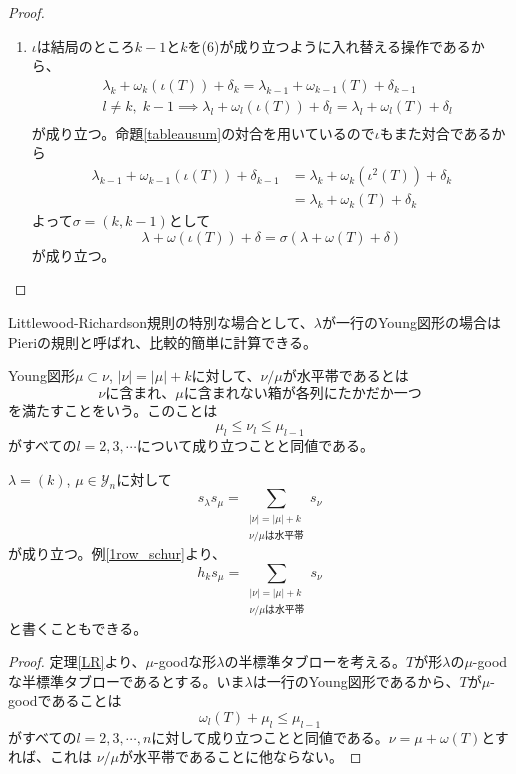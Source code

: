 \documentclass{ltjsreport}
\begin{document}
\begin{proof}
\begin{enumerate}
        \item $\iota$は結局のところ$k-1$と$k$を(6)が成り立つように入れ替える操作であるから、
        \begin{align*}
            &\lambda_{k}+\omega_k(\iota(T))+\delta_k=\lambda_{k-1}+\omega_{k-1}(T)+\delta_{k-1}\\
            & l\neq k,\;k-1\implies \lambda_{l}+\omega_l(\iota(T))+\delta_l=\lambda_{l}+\omega_{l}(T)+\delta_{l}\\
        \end{align*}
        が成り立つ。命題\ref{tableausum}の対合を用いているので$\iota$もまた対合であるから
        \begin{align*}
            \lambda_{k-1}+\omega_{k-1}(\iota(T))+\delta_{k-1}
            &=\lambda_{k}+\omega_{k}(\iota^2(T))+\delta_k\\
            &=\lambda_{k}+\omega_{k}(T)+\delta_k
        \end{align*}
        よって$\sigma=(k, k-1)$として
        \[
            \lambda+\omega(\iota(T))+\delta=\sigma(\lambda+\omega(T)+\delta)
        \]
        が成り立つ。
    \end{enumerate}
\end{proof}



Littlewood-Richardson規則の特別な場合として、$\lambda$が一行のYoung図形の場合はPieriの規則と呼ばれ、比較的簡単に計算できる。

\begin{defin}
    Young図形$\mu\subset \nu$, $|\nu|=|\mu|+k$に対して、$\nu/\mu$が水平帯であるとは
    \[
    \text{
        $\nu$に含まれ、$\mu$に含まれない箱が各列にたかだか一つ
        }
    \]
    を満たすことをいう。このことは
    \[
    \mu_l\leq \nu_l\leq \mu_{l-1}    
    \]
    がすべての$l=2,3,\cdots$について成り立つことと同値である。
\end{defin}

\begin{cor}[Pieriの規則]\label{Pieri}
    $\lambda=(k)$, $\mu\in\mathcal{Y}_n$に対して
    \[
    s_\lambda s_\mu=\sum_{\substack{|\nu|=|\mu|+k\\\nu/\mu\text{は水平帯}}}s_\nu    
    \]
    が成り立つ。例\ref{1row_schur}より、
    \[
    h_ks_\mu=\sum_{\substack{|\nu|=|\mu|+k\\\nu/\mu\text{は水平帯}}}s_\nu  
    \]
    と書くこともできる。
\end{cor}

\begin{proof}
    定理\ref{LR}より、$\mu$-goodな形$\lambda$の半標準タブローを考える。$T$が形$\lambda$の$\mu$-goodな半標準タブローであるとする。いま$\lambda$は一行のYoung図形であるから、$T$が$\mu$-goodであることは
    \[
    \omega_{l}(T)+\mu_l\leq \mu_{l-1}    
    \]
    がすべての$l=2,3,\cdots, n$に対して成り立つことと同値である。$\nu=\mu+\omega(T)$とすれば、これは
    $\nu/\mu$が水平帯であることに他ならない。
\end{proof}
\end{document}
